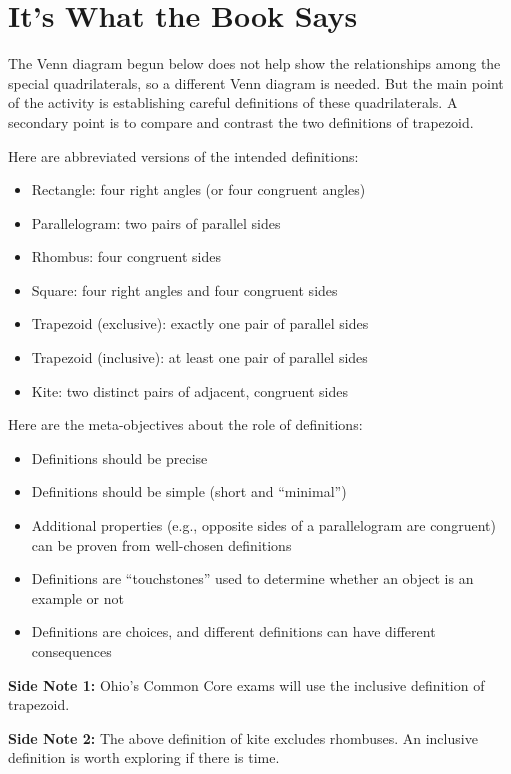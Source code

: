 \newpage
\section{It's What the Book Says} 
\begin{teachingnote}
The Venn diagram begun below does not help show the relationships among the special quadrilaterals, so a different Venn diagram is needed.  But the main point of the activity is establishing careful definitions of these quadrilaterals.  A secondary point is to compare and contrast the two definitions of trapezoid.  

Here are abbreviated versions of the intended definitions: 
\begin{itemize}\itemsep0em
\item Rectangle:  four right angles (or four congruent angles)
\item Parallelogram:  two pairs of parallel sides
\item Rhombus:  four congruent sides
\item Square:  four right angles and four congruent sides
\item Trapezoid (exclusive): exactly one pair of parallel sides
\item Trapezoid (inclusive): at least one pair of parallel sides
\item Kite: two distinct pairs of adjacent, congruent sides
\end{itemize}

Here are the meta-objectives about the role of definitions:  
\begin{itemize}\itemsep0em
\item Definitions should be precise
\item Definitions should be simple (short and ``minimal'')
\item Additional properties (e.g., opposite sides of a parallelogram are congruent) can be proven from well-chosen definitions 
\item Definitions are ``touchstones'' used to determine whether an object is an example or not
\item Definitions are choices, and different definitions can have different consequences
\end{itemize}
\textbf{Side Note 1:} Ohio's Common Core exams will use the inclusive definition of trapezoid.

\textbf{Side Note 2:} The above definition of kite excludes rhombuses.  An inclusive definition is worth exploring if there is time.  
\end{teachingnote}

